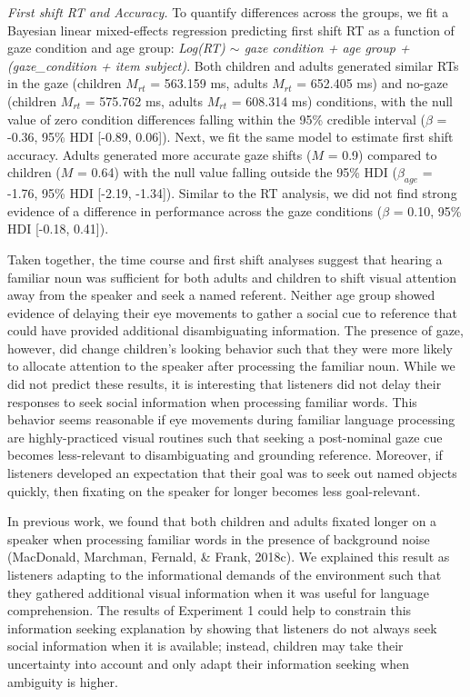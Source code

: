 \documentclass[oneside]{report}
\begin{document}
\emph{First shift RT and Accuracy.} To quantify differences across the
groups, we fit a Bayesian linear mixed-effects regression predicting
first shift RT as a function of gaze condition and age group:
\emph{Log(RT) \(\sim\) gaze condition + age group + (gaze\_condition +
item \textbar{} subject)}. Both children and adults generated similar
RTs in the gaze (children \(M_{rt}\) = 563.159 ms, adults \(M_{rt}\) =
652.405 ms) and no-gaze (children \(M_{rt}\) = 575.762 ms, adults
\(M_{rt}\) = 608.314 ms) conditions, with the null value of zero
condition differences falling within the 95\% credible interval
(\(\beta\) = -0.36, 95\% HDI {[}-0.89, 0.06{]}). Next, we fit the same
model to estimate first shift accuracy. Adults generated more accurate
gaze shifts (\(M\) = 0.9) compared to children (\(M\) = 0.64) with the
null value falling outside the 95\% HDI (\(\beta_{age}\) = -1.76, 95\%
HDI {[}-2.19, -1.34{]}). Similar to the RT analysis, we did not find
strong evidence of a difference in performance across the gaze
conditions (\(\beta\) = 0.10, 95\% HDI {[}-0.18, 0.41{]}).

Taken together, the time course and first shift analyses suggest that
hearing a familiar noun was sufficient for both adults and children to
shift visual attention away from the speaker and seek a named referent.
Neither age group showed evidence of delaying their eye movements to
gather a social cue to reference that could have provided additional
disambiguating information. The presence of gaze, however, did change
children's looking behavior such that they were more likely to allocate
attention to the speaker after processing the familiar noun. While we
did not predict these results, it is interesting that listeners did not
delay their responses to seek social information when processing
familiar words. This behavior seems reasonable if eye movements during
familiar language processing are highly-practiced visual routines such
that seeking a post-nominal gaze cue becomes less-relevant to
disambiguating and grounding reference. Moreover, if listeners developed
an expectation that their goal was to seek out named objects quickly,
then fixating on the speaker for longer becomes less goal-relevant.

In previous work, we found that both children and adults fixated longer
on a speaker when processing familiar words in the presence of
background noise (MacDonald, Marchman, Fernald, \& Frank, 2018c). We
explained this result as listeners adapting to the informational demands
of the environment such that they gathered additional visual information
when it was useful for language comprehension. The results of Experiment
1 could help to constrain this information seeking explanation by
showing that listeners do not always seek social information when it is
available; instead, children may take their uncertainty into account and
only adapt their information seeking when ambiguity is higher.
\end{document}
